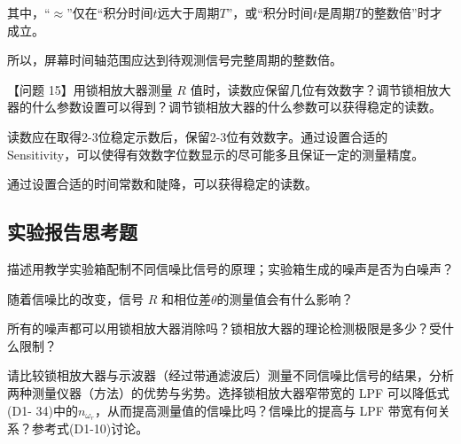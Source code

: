 \documentclass[dvipsnames, svgnames,a4paper,11pt]{article}
\begin{document}
		其中，“$\approx$”仅在“积分时间$t$远大于周期$T$”，或“积分时间$t$是周期$T$的整数倍”时才成立。

		所以，屏幕时间轴范围应达到待观测信号完整周期的整数倍。


		\vspace{0.05\textwidth} %


		【问题 15】用锁相放大器测量 $R$ 值时，读数应保留几位有效数字？调节锁相放大器的什么参数设置可以得到？调节锁相放大器的什么参数可以获得稳定的读数。

		读数应在取得2-3位稳定示数后，保留2-3位有效数字。通过设置合适的Sensitivity，可以使得有效数字位数显示的尽可能多且保证一定的测量精度。

		通过设置合适的时间常数和陡降，可以获得稳定的读数。




\subsection{实验报告思考题}


\begin{question}
	描述用教学实验箱配制不同信噪比信号的原理；实验箱生成的噪声是否为白噪声？
\end{question}










\begin{question}
	随着信噪比的改变，信号 $R$ 和相位差$\theta$的测量值会有什么影响？
\end{question}





\begin{question}
	所有的噪声都可以用锁相放大器消除吗？锁相放大器的理论检测极限是多少？受什么限制？
\end{question}




\begin{question}
	请比较锁相放大器与示波器（经过带通滤波后）测量不同信噪比信号的结果，分析两种测量仪器（方法）的优势与劣势。选择锁相放大器窄带宽的 LPF 可以降低式(D1- 34)中的$n_{\omega_r}$，从而提高测量值的信噪比吗？信噪比的提高与 LPF 带宽有何关系？参考式(D1-10)讨论。
\end{question}
\end{document}
